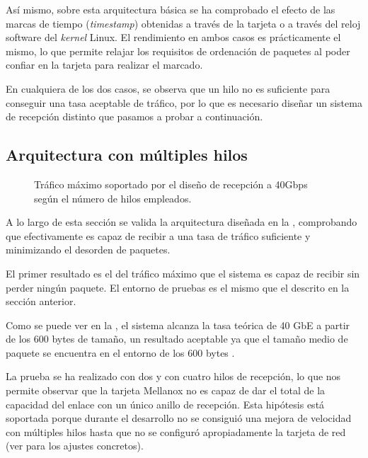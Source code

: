 \documentclass[oneside, draft]{epstfg}
\begin{document}
Así mismo, sobre esta arquitectura básica se ha comprobado el efecto de las marcas de tiempo (\textit{timestamp}) obtenidas a través de la tarjeta o a través del reloj software del \textit{kernel} Linux. El rendimiento en ambos casos es prácticamente el mismo, lo que permite relajar los requisitos de ordenación de paquetes al poder confiar en la tarjeta para realizar el marcado.

En cualquiera de los dos casos, se observa que un hilo no es suficiente para conseguir una tasa aceptable de tráfico, por lo que es necesario diseñar un sistema de recepción distinto que pasamos a probar a continuación.

\subsection{Arquitectura con múltiples hilos}

\begin{figure}[b]
\caption[Capacidad del diseño de recepción a 40 Gbps]{Tráfico máximo soportado por el diseño de recepción a 40Gbps según el número de hilos empleados.}
\label{fig:Validacion:MulticoreMaxRate}
\end{figure}

A lo largo de esta sección se valida la arquitectura diseñada en la , comprobando que efectivamente es capaz de recibir a una tasa de tráfico suficiente y minimizando el desorden de paquetes.

El primer resultado es el del tráfico máximo que el sistema es capaz de recibir sin perder ningún paquete. El entorno de pruebas es el mismo que el descrito en la sección anterior.

Como se puede ver en la , el sistema alcanza la tasa teórica de 40 GbE a partir de los 600 bytes de tamaño, un resultado aceptable ya que el tamaño medio de paquete se encuentra en el entorno de los 600 bytes \cite{john2007analysis}.

La prueba se ha realizado con dos y con cuatro hilos de recepción, lo que nos permite observar que la tarjeta Mellanox no es capaz de dar el total de la capacidad del enlace con un único anillo de recepción. Esta hipótesis está soportada porque durante el desarrollo no se consiguió una mejora de velocidad con múltiples hilos hasta que no se configuró apropiadamente la tarjeta de red (ver  para los ajustes concretos).
\end{document}
